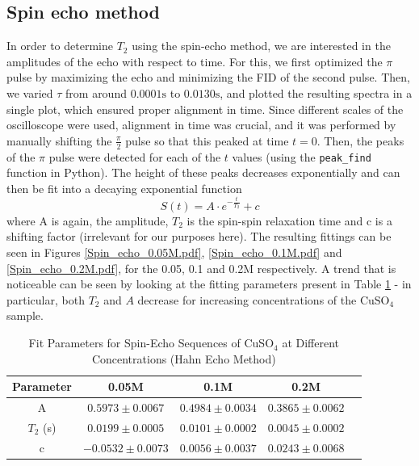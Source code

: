 \documentclass[12pt]{article}
\begin{document}
\subsection{Spin echo method}
In order to determine $T_2$ using the spin-echo method, we are interested in the amplitudes of the echo with respect to time.
For this, we first optimized the $\pi$ pulse by maximizing the echo and minimizing the FID of the second pulse. Then, we varied $\tau$ from around $0.0001\text{s}$ to $0.0130 \text{s}$, and plotted the resulting spectra in a single plot, which ensured proper alignment in time. Since different scales of the oscilloscope were used, alignment in time was crucial, and it was performed by manually shifting the $\frac{\pi}{2}$ pulse so that this peaked at time $t = 0$.
Then, the peaks of the $\pi$ pulse were detected for each of the $t$ values (using the \verb|peak_find| function in Python). The height of these peaks decreases exponentially and can then be fit into a decaying exponential function \[
	S(t) = A \cdot e^{-\frac{t}{T_2}} + c
\]
where A is again, the amplitude, $T_2$ is the spin-spin relaxation time and c is a shifting factor (irrelevant for our purposes here).
The resulting fittings can be seen in Figures \ref{Spin_echo_0.05M.pdf}, \ref{Spin_echo_0.1M.pdf} and \ref{Spin_echo_0.2M.pdf}, for the 0.05, 0.1 and 0.2M respectively.
A trend that is noticeable can be seen by looking at the fitting parameters present in Table \ref{tab:se} - in particular, both $T_2$ and $A$ decrease for increasing concentrations of the $\text{CuSO}_4$ sample.




\begin{table}[ht]
\label{tab:se}
\centering
\begin{tabular}{ccccc}
\toprule
\textbf{Parameter} & \textbf{0.05M} & \textbf{0.1M} & \textbf{0.2M} \\
\midrule
A & $0.5973 \pm 0.0067$ & $0.4984 \pm 0.0034$ & $0.3865 \pm 0.0062$ \\
$T_2$ (s) & $0.0199 \pm 0.0005$ & $0.0101 \pm 0.0002$ & $0.0045 \pm 0.0002$ \\
c & $-0.0532 \pm 0.0073$ & $0.0056 \pm 0.0037$ & $0.0243 \pm 0.0068$ \\
\bottomrule
\end{tabular}
\caption{Fit Parameters for Spin-Echo Sequences of CuSO$_4$ at Different Concentrations (Hahn Echo Method)}
\end{table}
\end{document}
